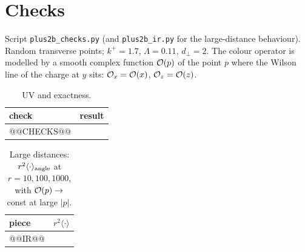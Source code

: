 \documentclass[10pt]{article}
\begin{document}
\section{Checks}\label{sec:checks}
Script \texttt{plus2b\_checks.py} (and \texttt{plus2b\_ir.py} for the large-distance behaviour). Random transverse points; $k^+=1.7$, $\Lambda=0.11$, $d_\perp=2$. The colour operator is modelled by a smooth complex function ${\cal O}(p)$ of the point $p$ where the Wilson line of the charge at $y$ sits: ${\cal O}_x={\cal O}(x)$, ${\cal O}_z={\cal O}(z)$.
\begin{center}\small
\begin{longtable}{@{}p{}p{}@{}}
\caption{UV and exactness.}\label{tab:checks}\\
\toprule
check & result\\\midrule
@@CHECKS@@
\bottomrule
\end{longtable}
\begin{longtable}{@{}p{}p{}@{}}
\caption{Large distances: $r^2\langle\cdot\rangle_{\rm angle}$ at $r=10,100,1000$, with ${\cal O}(p)\to$ const at large $|p|$.}\label{tab:ir}\\
\toprule
piece & $r^2\langle\cdot\rangle$\\\midrule
@@IR@@
\bottomrule
\end{longtable}
\end{center}
\end{document}
